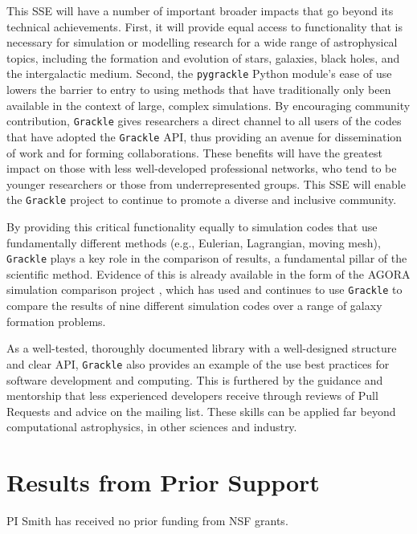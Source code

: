 \documentclass[11pt]{article}
\newcommand{\grackle}{\texttt{Grackle}}
\begin{document}
\begin{flushleft}
This SSE will have a number of important broader impacts that go
beyond its technical achievements.  First, it will provide equal
access to functionality that is necessary for simulation or modelling
research for a wide range of astrophysical topics, including the
formation and evolution of stars, galaxies, black holes, and the
intergalactic medium.
Second, the \texttt{pygrackle} Python module's ease of use lowers the
barrier to entry to using methods that have traditionally only been
available in the context of large, complex simulations.  By
encouraging community contribution, \grackle{} gives researchers
a direct channel to all users of the codes that have adopted the
\grackle{} API, thus providing an avenue for dissemination of
work and for forming collaborations.  These benefits will have the
greatest impact on those with less well-developed professional
networks, who tend to be younger researchers or those from
underrepresented groups.  This SSE will enable the \grackle{} project
to continue to promote a diverse and inclusive community.

By providing this critical functionality equally to simulation codes
that use fundamentally different methods (e.g., Eulerian, Lagrangian,
moving mesh), \grackle{} plays a key role in the comparison of
results, a fundamental pillar of the scientific method.  Evidence of
this is already available in the form of the AGORA simulation
comparison project \citep{2014ApJS..210...14K, 2016ApJ...833..202K},
which has used and continues to use \grackle{} to compare the results
of nine
different simulation codes over a range of galaxy formation problems.

As a well-tested, thoroughly documented library with a well-designed
structure and clear API, \grackle{} also provides an example of the
use best practices for software development and computing.  This is
furthered by the guidance and mentorship that less experienced
developers receive through reviews of Pull Requests and
advice on the mailing list.  These skills can be applied far
beyond computational astrophysics, in other sciences and industry.

\section{Results from Prior Support}

PI Smith has received no prior funding from NSF grants.

\clearpage
{}

\end{flushleft}
\end{document}
